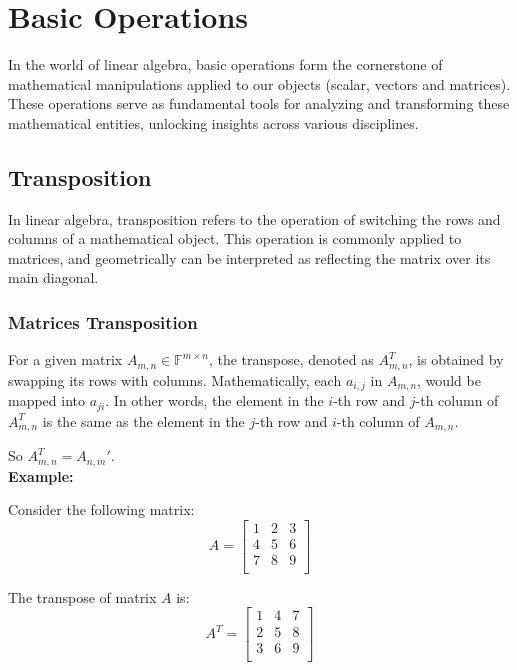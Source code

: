 \section{Basic Operations}
In the world of linear algebra, basic operations form the cornerstone of mathematical manipulations applied to our objects (scalar, vectors and matrices). These operations serve as fundamental tools for analyzing and transforming these mathematical entities, unlocking insights across various disciplines.

\subsection{Transposition}

In linear algebra, transposition refers to the operation of switching the rows and columns of a mathematical object. This operation is commonly applied to matrices, and geometrically can be interpreted as reflecting the matrix over its main diagonal.

\subsubsection{Matrices Transposition}

For a given matrix $A_{m,n} \in \mathbb F^{m \times n}$, the transpose, denoted as $A_{m,n}^T$, is obtained by swapping its rows with columns. Mathematically, each $a_{i,j}$ in $A_{m,n}$, would be mapped into $a_{ji}$. In other words, the element in the $i$-th row and $j$-th column of $A_{m,n}^T$ is the same as the element in the $j$-th row and $i$-th column of $A_{m,n}$.

So $A_{m,n}^T = A_{n,m}'$.
\\

\textbf{Example:}

Consider the following matrix:
\[
A = \begin{bmatrix}
    1 & 2 & 3 \\
    4 & 5 & 6 \\
    7 & 8 & 9 \\
\end{bmatrix}
\]

The transpose of matrix $A$ is:
\[
A^T = \begin{bmatrix}
    1 & 4 & 7 \\
    2 & 5 & 8 \\
    3 & 6 & 9 \\
\end{bmatrix}
\]

